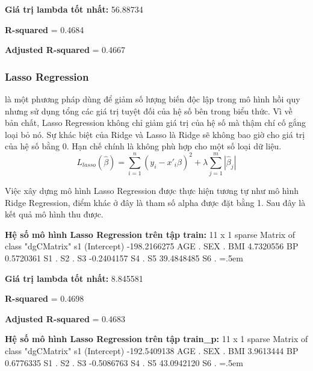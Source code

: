 \documentclass[runningheads]{llncs}
\newenvironment{lcverbatim}
 {\SaveVerbatim{cverb}}
 {\endSaveVerbatim
  \flushleft\fboxrule=0pt\fboxsep=.5em
  \colorbox{cverbbg}{%
    \makebox[\dimexpr\linewidth-2\fboxsep][l]{\BUseVerbatim{cverb}}%
  }
  \endflushleft
}
\begin{document}
\textbf{Giá trị lambda tốt nhất:} 56.88734

\textbf{R-squared} = 0.4684

\textbf{Adjusted R-squared} = 0.4667

\subsubsection{Lasso Regression}
là một phương pháp dùng để giảm số lượng biến độc lập trong mô hình hồi quy nhưng sử dụng tổng các giá trị tuyệt đối của hệ số bên trong biểu thức. Vì về bản chất, Lasso Regression không chỉ giảm giá trị của hệ số mà thậm chí cố gắng loại bỏ nó. Sự khác biệt của Ridge và Lasso là Ridge sẽ không bao giờ cho giá trị của hệ số bằng 0. Hạn chế chính là không phù hợp cho một số loại dữ liệu.
	\begin{equation}
	L_{lasso}(\hat{\beta})=\sum^{n}_{i=1}{(y_i-x'_i\hat{\beta})^2}+\lambda\sum^{m}_{j=1}{|\hat{\beta}_j|}
	\end{equation}

Việc xây dựng mô hình Lasso Regression được thực hiện tương tự như mô hình Ridge Regression, điểm khác ở đây là tham số alpha được đặt bằng 1. Sau đây là kết quả mô hình thu được.

\vspace{0.5cm}
\textbf{Hệ số mô hình Lasso Regression trên tập train:}
\begin{lcverbatim}
11 x 1 sparse Matrix of class "dgCMatrix"
                      s1
(Intercept) -198.2166275
AGE            .        
SEX            .        
BMI            4.7320556
BP             0.5720361
S1             .        
S2             .        
S3            -0.2404157
S4             .        
S5            39.4848485
S6             .        
\end{lcverbatim}

\textbf{Giá trị lambda tốt nhất:} 8.845581

\textbf{R-squared} = 0.4698

\textbf{Adjusted R-squared} = 0.4683

\vspace{0.5cm}
\textbf{Hệ số mô hình Lasso Regression trên tập train\_p:}
\begin{lcverbatim}
11 x 1 sparse Matrix of class "dgCMatrix"
                      s1
(Intercept) -192.5409138
AGE            .        
SEX            .        
BMI            3.9613444
BP             0.6776335
S1             .        
S2             .        
S3            -0.5086763
S4             .        
S5            43.0942120
S6             .        
\end{lcverbatim}
\end{document}
